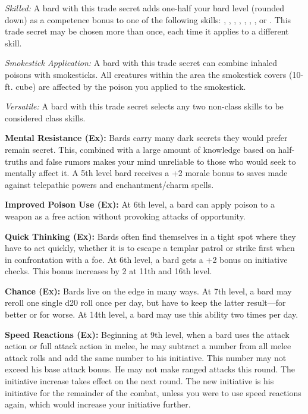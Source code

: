 \textit{Skilled:} A bard with this trade secret adds one-half your bard level (rounded down) as a competence bonus to one of the following skills: , , , , , , ,  or . This trade secret may be chosen more than once, each time it applies to a different skill.

\textit{Smokestick Application:} A bard with this trade secret can combine inhaled poisons with smokesticks. All creatures within the area the smokestick covers (10-ft. cube) are affected by the poison you applied to the smokestick.

\textit{Versatile:} A bard with this trade secret selects any two non-class skills to be considered class skills.

\textbf{Mental Resistance (Ex):} Bards carry many dark secrets they would prefer remain secret. This, combined with a large amount of knowledge based on half-truths and false rumors makes your mind unreliable to those who would seek to mentally affect it. A 5th level bard receives a +2 morale bonus to saves made against telepathic powers and enchantment/charm spells.

\textbf{Improved Poison Use (Ex):} At 6th level, a bard can apply poison to a weapon as a free action without provoking attacks of opportunity.

\textbf{Quick Thinking (Ex):} Bards often find themselves in a tight spot where they have to act quickly, whether it is to escape a templar patrol or strike first when in confrontation with a foe. At 6th level, a bard gets a +2 bonus on initiative checks. This bonus increases by 2 at 11th and 16th level.

\textbf{Chance (Ex):} Bards live on the edge in many ways. At 7th level, a bard may reroll one single d20 roll once per day, but have to keep the latter result---for better or for worse. At 14th level, a bard may use this ability two times per day.

\textbf{Speed Reactions (Ex):} Beginning at 9th level, when a bard uses the attack action or full attack action in melee, he may subtract a number from all melee attack rolls and add the same number to his initiative. This number may not exceed his base attack bonus. He may not make ranged attacks this round. The initiative increase takes effect on the next round. The new initiative is his initiative for the remainder of the combat, unless you were to use speed reactions again, which would increase your initiative further.

